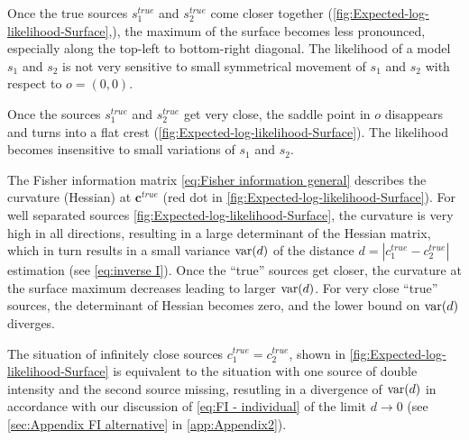 Once the true sources $s_1^{true}$ and $s_2^{true}$ come closer together (\autoref{fig:Expected-log-likelihood-Surface}\bbb,\ccc), the maximum of the surface becomes less pronounced, especially along the top-left to bottom-right diagonal. The likelihood of a model $s_1$ and $s_2$ is not very sensitive to small symmetrical movement of $s_1$ and $s_2$ with respect to $o=(0,0)$. 

Once the sources $s_1^{true}$ and $s_2^{true}$ get very close, the saddle point in $o$ disappears and turns into a flat crest (\autoref{fig:Expected-log-likelihood-Surface}\ddd). The likelihood becomes insensitive to small variations of $s_1$ and $s_2$. 

The Fisher information matrix \autoref{eq:Fisher information general} describes the curvature (Hessian) at $\bm{c}^{true}$ (red dot in \autoref{fig:Expected-log-likelihood-Surface}\aaa). For well separated sources \autoref{fig:Expected-log-likelihood-Surface}\aaa{}, the curvature is very high in all directions, resulting in a large determinant of the Hessian matrix, which in turn results in a small variance $\mathrm{var}(d)$ of the distance $d=\left|c_1^{true}-c_2^{true}\right|$ estimation  (see \autoref{eq:inverse I}). Once the ``true'' sources get closer, the curvature at the surface maximum decreases leading to larger $\mathrm{var}(d)$. For very close ``true'' sources, the determinant of Hessian becomes zero, and the lower bound on $\mathrm{var}(d)$ diverges. 

The situation of infinitely close sources $c_1^{true}=c_2^{true}$, shown in \autoref{fig:Expected-log-likelihood-Surface}\ddd{}  is equivalent to the situation with one source of double intensity and the second source missing, resutling in a divergence of $\mathrm{var}(d)$ in accordance with our discussion of \autoref{eq:FI - individual} of the limit $d\rightarrow 0$ (see \autoref{sec:Appendix FI alternative} in \autoref{app:Appendix2}).

